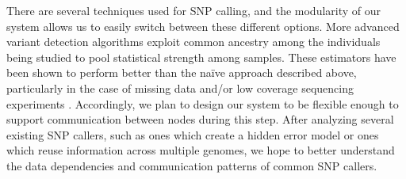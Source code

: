 \documentclass[10pt]{article}
\begin{document}
%

There are several techniques used for SNP calling,
and the modularity of our system allows us to easily switch between these
different options.  More advanced variant detection algorithms exploit common
ancestry among the individuals being studied to pool statistical strength among
samples.  These estimators have been shown to perform better than the na\"{i}ve
approach described above, particularly in the case of missing data and/or low
coverage sequencing experiments \cite{nielsen}.  Accordingly, we plan to design
our system to be flexible enough to support communication between nodes during
this step.  After analyzing several existing SNP callers, such as ones which
create a hidden error model or ones which reuse information across multiple
genomes, we hope to better understand the data dependencies and communication
patterns of common SNP callers.  

\end{document}
